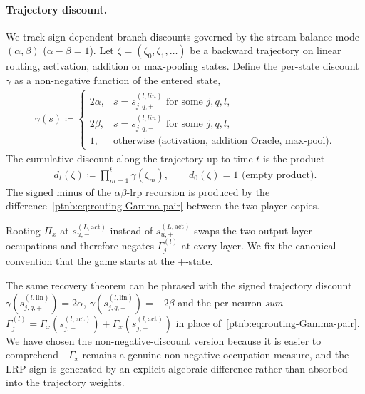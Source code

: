 \paragraph{Trajectory discount.}
We track sign-dependent branch discounts governed by the stream-balance mode $(\alpha, \beta)$
($\alpha-\beta=1$). Let $\zeta = (\zeta_0,\zeta_1,\dots)$ be a backward trajectory on linear
routing, activation, addition or max-pooling states. Define the per-state discount $\gamma$ as a
non-negative function of the entered state,
\begin{align}\label{ptnb:eq:routing-edge-discount}
    \gamma(s) \coloneqq
    \begin{cases}
        2\alpha, & s = s_{j,q,+}^{(l, lin)} \text{ for some } j,q,l,\\
        2\beta, & s = s_{j,q,-}^{(l, lin)} \text{ for some } j,q,l,\\
        1, & \text{otherwise (activation, addition Oracle, max-pool).}
    \end{cases}
\end{align}
The cumulative discount along the trajectory up to time $t$ is the product
\begin{align}\label{ptnb:eq:routing-discount}
    d_t(\zeta) \coloneqq \prod_{m=1}^{t} \gamma(\zeta_m),
    \qquad d_0(\zeta) = 1 \text{ (empty product).}
\end{align}
The signed minus of the $\alpha\beta$-\ac{lrp} recursion is produced by the
difference~\eqref{ptnb:eq:routing-Gamma-pair} between the two player copies.

\begin{remark}\label{ptnb:rem:starting-player}
Rooting $\Pi_x$ at $s_{u,-}^{(L,\mathrm{act})}$ instead of $s_{u,+}^{(L,\mathrm{act})}$ swaps the
two output-layer occupations and therefore negates $\Gamma^{(l)}_j$ at every layer. We fix the
canonical convention that the game starts at the $+$-state.
\end{remark}

\begin{remark}\label{ptnb:rem:signed-discount-alt}
The same recovery theorem can be phrased with the signed trajectory discount
$\gamma(s_{j,q,+}^{(l,\mathrm{lin})}) = 2\alpha$, $\gamma(s_{j,q,-}^{(l,\mathrm{lin})}) = -2\beta$
and the per-neuron \emph{sum} $\Gamma^{(l)}_j = \Gamma_x(s_{j,+}^{(l,\mathrm{act})}) +
    \Gamma_x(s_{j,-}^{(l,\mathrm{act})})$ in place of~\eqref{ptnb:eq:routing-Gamma-pair}. We have chosen the
non-negative-discount version because it is easier to comprehend---$\Gamma_x$ remains a genuine
non-negative occupation measure, and the LRP sign is generated by an explicit algebraic difference
rather than absorbed into the trajectory weights.
\end{remark}

